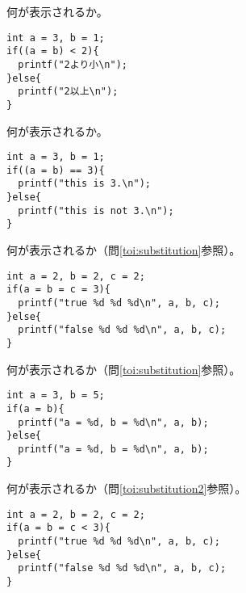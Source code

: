 \documentclass[12pt,a4j]{jarticle}
\newcounter{toi}
\def\toi{%
\bigskip\bigskip\noindent
\addtocounter{toi}{1}
\shadowbox{\bfseries\large 問\thetoi}
\nopagebreak[4]\bigskip\nopagebreak[4]
}
\begin{document}





\toi


何が表示されるか。
\begin{verbatim}
int a = 3, b = 1;
if((a = b) < 2){
  printf("2より小\n");
}else{
  printf("2以上\n");
}
\end{verbatim}




\toi


何が表示されるか。
\begin{verbatim}
int a = 3, b = 1;
if((a = b) == 3){
  printf("this is 3.\n");
}else{
  printf("this is not 3.\n");
}
\end{verbatim}




\toi

何が表示されるか（問\ref{toi:substitution}参照）。
\begin{verbatim}
int a = 2, b = 2, c = 2;
if(a = b = c = 3){
  printf("true %d %d %d\n", a, b, c);
}else{
  printf("false %d %d %d\n", a, b, c);
}
\end{verbatim}



\toi

何が表示されるか（問\ref{toi:substitution}参照）。
\begin{verbatim}
int a = 3, b = 5;
if(a = b){
  printf("a = %d, b = %d\n", a, b);
}else{
  printf("a = %d, b = %d\n", a, b);
}
\end{verbatim}





\toi

何が表示されるか（問\ref{toi:substitution2}参照）。
\begin{verbatim}
int a = 2, b = 2, c = 2;
if(a = b = c < 3){
  printf("true %d %d %d\n", a, b, c);
}else{
  printf("false %d %d %d\n", a, b, c);
}
\end{verbatim}

\end{document}
